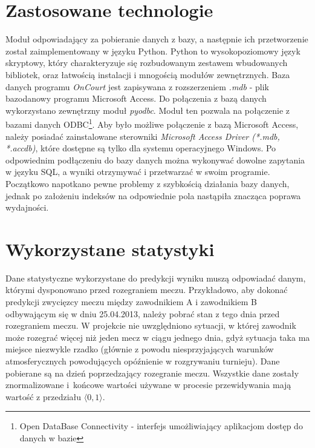 \section{Zastosowane technologie}
\label{Sec:DataTech}
Moduł odpowiadający za pobieranie danych z bazy, a następnie ich przetworzenie został zaimplementowany w języku Python. Python to wysokopoziomowy język skryptowy, który charakteryzuje się rozbudowanym zestawem wbudowanych bibliotek, oraz łatwością instalacji i mnogością modułów zewnętrznych.
Baza danych programu \textit{OnCourt} jest zapisywana z rozszerzeniem \textit{.mdb} - plik bazodanowy programu Microsoft Access. Do połączenia z bazą danych wykorzystano zewnętrzny moduł \textit{pyodbc}. Moduł ten pozwala na połączenie z bazami danych ODBC\footnote{Open DataBase Connectivity - interfejs umożliwiający aplikacjom dostęp do danych w bazie}. Aby było możliwe połączenie z bazą Microsoft Access, należy posiadać zainstalowane sterowniki \textit{Microsoft Access Driver (*.mdb, *.accdb)}, które dostępne są tylko dla systemu operacyjnego Windows. Po odpowiednim podłączeniu do bazy danych można wykonywać dowolne zapytania w języku SQL, a wyniki otrzymywać i przetwarzać w swoim programie. Początkowo napotkano pewne problemy z szybkością działania bazy danych, jednak po założeniu indeksów na odpowiednie pola nastąpiła znacząca poprawa wydajności.

\section{Wykorzystane statystyki}
\label{Sec:DataUsed}
Dane statystyczne wykorzystane do predykcji wyniku muszą odpowiadać danym, którymi dysponowano przed rozegraniem meczu. 
Przykładowo, aby dokonać predykcji zwycięzcy meczu między zawodnikiem A i zawodnikiem B odbywającym się w dniu 25.04.2013, należy pobrać stan z tego dnia przed rozegraniem meczu. W projekcie nie uwzględniono sytuacji, w której zawodnik może rozegrać więcej niż jeden mecz w ciągu jednego dnia, gdyż sytuacja taka ma miejsce niezwykle rzadko (głównie z powodu niesprzyjających warunków atmosferycznych powodujących opóźnienie w rozgrywaniu turnieju). Dane pobierane są na dzień poprzedzający rozegranie meczu. Wszystkie dane zostały znormalizowane i~końcowe wartości używane w procesie przewidywania mają wartość z przedziału $\langle 0, 1\rangle$. 

